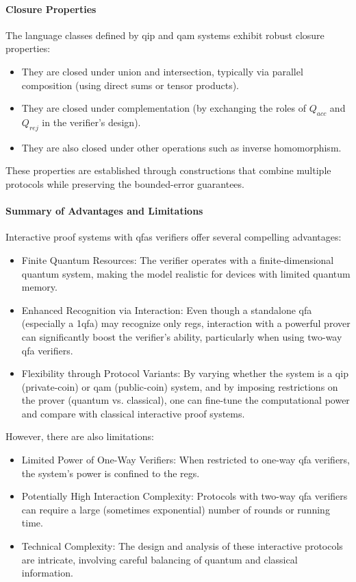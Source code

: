 \paragraph{Closure Properties}
The language classes defined by \gls{qip} and \gls{qam} systems exhibit robust closure properties:
\begin{itemize}
  \item They are closed under union and intersection, typically via parallel composition (using direct sums or tensor products).
  \item They are closed under complementation (by exchanging the roles of $Q_{acc}$ and $Q_{rej}$ in the verifier's design).
  \item They are also closed under other operations such as inverse homomorphism.
\end{itemize}
These properties are established through constructions that combine multiple protocols while preserving the bounded-error guarantees.

\paragraph{Summary of Advantages and Limitations}
Interactive proof systems with \glspl{qfa} verifiers offer several compelling advantages:
\begin{itemize}
  \item Finite Quantum Resources: The verifier operates with a finite-dimensional quantum system, making the model realistic for devices with limited quantum memory.
  \item Enhanced Recognition via Interaction: Even though a standalone qfa (especially a 1qfa) may recognize only \glspl{reg}, interaction with a powerful prover can significantly boost the verifier's ability, particularly when using two-way qfa verifiers.
  \item Flexibility through Protocol Variants: By varying whether the system is a \gls{qip} (private-coin) or \gls{qam} (public-coin) system, and by imposing restrictions on the prover (quantum vs. classical), one can fine-tune the computational power and compare with classical interactive proof systems.
\end{itemize}
However, there are also limitations:
\begin{itemize}
  \item {Limited Power of One-Way Verifiers:} When restricted to one-way qfa verifiers, the system's power is confined to the \glspl{reg}.
  \item {Potentially High Interaction Complexity:} Protocols with two-way qfa verifiers can require a large (sometimes exponential) number of rounds or running time.
  \item {Technical Complexity:} The design and analysis of these interactive protocols are intricate, involving careful balancing of quantum and classical information.
\end{itemize}

